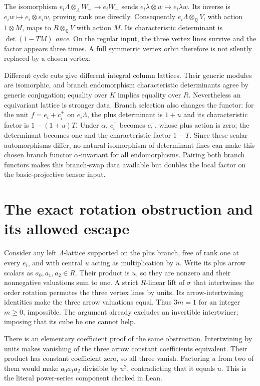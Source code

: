 The isomorphism $e_i\Lambda\otimes_\Lambda W_+\to e_iW_+$ sends $e_i\lambda\otimes w\mapsto e_i\lambda w$. Its inverse is $e_iw\mapsto e_i\otimes e_iw$, proving rank one directly. Consequently $e_i\Lambda\otimes_{\mathbb Q}V$, with action $1\otimes M$, maps to $R\otimes_{\mathbb Q}V$ with action $M$. Its characteristic determinant is $\det(1-TM)$ \emph{once}. On the regular input, the three vertex lines survive and the factor appears three times. A full symmetric vertex orbit therefore is not silently replaced by a chosen vertex.

Different cycle cuts give different integral column lattices. Their generic modules are isomorphic, and branch endomorphism characteristic determinants agree by generic conjugation; equality over $K$ implies equality over $R$. Nevertheless an equivariant lattice is stronger data. Branch selection also changes the functor: for the unit $f=e_i+c_i^+$ on $e_i\Lambda$, the plus determinant is $1+u$ and its characteristic factor is $1-(1+u)T$. Under $\alpha$, $c_i^+$ becomes $c_i^-$, whose plus action is zero; the determinant becomes one and the characteristic factor $1-T$. Since these scalar automorphisms differ, no natural isomorphism of determinant lines can make this chosen branch functor $\alpha$-invariant for all endomorphisms. Pairing both branch functors makes this branch-swap data available but doubles the local factor on the basic-projective tensor input.

\section{The exact rotation obstruction and its allowed escape}
Consider any left $\Lambda$-lattice supported on the plus branch, free of rank one at every $e_i$, and with central $u$ acting as multiplication by $u$. Write its plus arrow scalars as $a_0,a_1,a_2\in R$. Their product is $u$, so they are nonzero and their nonnegative valuations sum to one. A strict $R$-linear lift of $\sigma$ that intertwines the order rotation permutes the three vertex lines by units. Its arrow-intertwining identities make the three arrow valuations equal. Thus $3m=1$ for an integer $m\ge0$, impossible. The argument already excludes an invertible intertwiner; imposing that its cube be one cannot help.

There is an elementary coefficient proof of the same obstruction. Intertwining by units makes vanishing of the three arrow constant coefficients equivalent. Their product has constant coefficient zero, so all three vanish. Factoring $u$ from two of them would make $a_0a_1a_2$ divisible by $u^2$, contradicting that it equals $u$. This is the literal power-series component checked in Lean.

